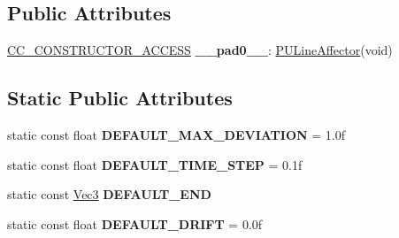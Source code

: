 \subsection*{Public Attributes}
\begin{DoxyCompactItemize}
\item 
\mbox{\label{classPULineAffector_a5155577697083d465e07ae29aa9bccd3}} 
\hyperlink{_2cocos2d_2cocos_2base_2ccConfig_8h_a25ef1314f97c35a2ed3d029b0ead6da0}{C\+C\+\_\+\+C\+O\+N\+S\+T\+R\+U\+C\+T\+O\+R\+\_\+\+A\+C\+C\+E\+SS} {\bfseries \+\_\+\+\_\+pad0\+\_\+\+\_\+}\+: \hyperlink{classPULineAffector}{P\+U\+Line\+Affector}(void)
\end{DoxyCompactItemize}
\subsection*{Static Public Attributes}
\begin{DoxyCompactItemize}
\item 
\mbox{\label{classPULineAffector_ae0151f8afab63abf4c331d52c338d259}} 
static const float {\bfseries D\+E\+F\+A\+U\+L\+T\+\_\+\+M\+A\+X\+\_\+\+D\+E\+V\+I\+A\+T\+I\+ON} = 1.\+0f
\item 
\mbox{\label{classPULineAffector_a9820a8cd96e1ed4709d6787ce457dfaa}} 
static const float {\bfseries D\+E\+F\+A\+U\+L\+T\+\_\+\+T\+I\+M\+E\+\_\+\+S\+T\+EP} = 0.\+1f
\item 
\mbox{\label{classPULineAffector_af49685faf20c81bd125afe654693bb64}} 
static const \hyperlink{classVec3}{Vec3} {\bfseries D\+E\+F\+A\+U\+L\+T\+\_\+\+E\+ND}
\item 
\mbox{\label{classPULineAffector_a487d7d3a1efa3c0b814e3fda53e29344}} 
static const float {\bfseries D\+E\+F\+A\+U\+L\+T\+\_\+\+D\+R\+I\+FT} = 0.\+0f
\end{DoxyCompactItemize}
